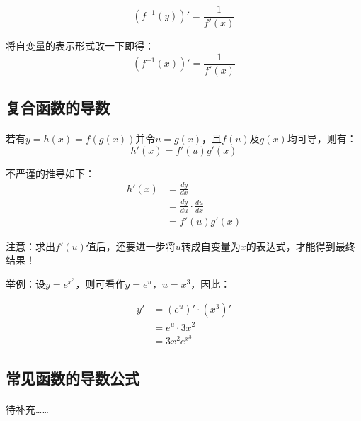 \begin{equation*}
(f^{-1}(y))' = \frac{1}{f'(x)}
\end{equation*}

将自变量的表示形式改一下即得：\\

\begin{equation*}
(f^{-1}(x))' = \frac{1}{f'(x)}
\end{equation*}

\subsection{复合函数的导数}

\paragraph{\quad}

若有$y = h(x) = f(g(x))$并令$u = g(x)$，且$f(u)$及$g(x)$均可导，则有：\\

\begin{equation*}
h'(x) = f'(u)g'(x)
\end{equation*}

不严谨的推导如下：\\

\begin{equation*}
\begin{aligned}
h'(x) &= \frac{dy}{dx}\\
&= \frac{dy}{du} \cdot \frac{du}{dx}\\
&= f'(u)g'(x)
\end{aligned}
\end{equation*}

注意：求出$f'(u)$值后，还要进一步将$u$转成自变量为$x$的表达式，才能得到最终结果！

举例：设$y = e^{x^3}$，则可看作$y = e^u$，$u = x^3$，因此：

\begin{equation*}
\begin{aligned}
y' &= (e^u)' \cdot (x^3)'\\
&= e^u \cdot 3x^2\\
&= 3x^2e^{x^3}
\end{aligned}
\end{equation*}

\subsection{常见函数的导数公式}

\paragraph{\quad}

待补充……

